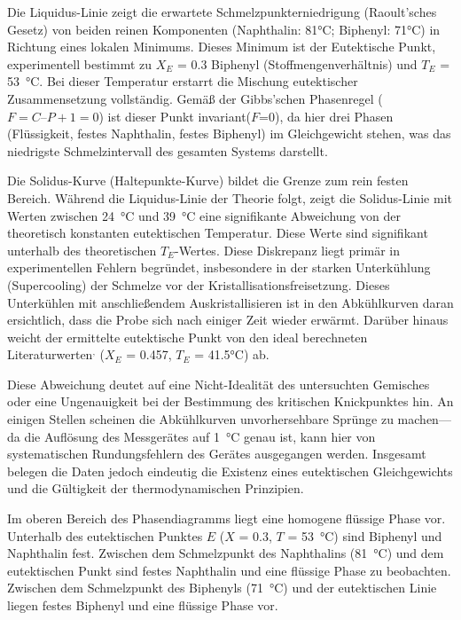 Die Liquidus-Linie zeigt die erwartete Schmelzpunkterniedrigung (Raoult'sches Gesetz) von beiden reinen Komponenten (Naphthalin: 81°C; Biphenyl: 71°C) in Richtung eines lokalen Minimums.
Dieses Minimum ist der Eutektische Punkt, experimentell bestimmt zu $X_E$ = 0.3 Biphenyl (Stoffmengenverhältnis) und $T_E$ = \qty{53}{\degreeCelsius}.
Bei dieser Temperatur erstarrt die Mischung eutektischer Zusammensetzung vollständig.
Gemäß der Gibbs'schen Phasenregel ($F = C – P + 1 = 0$) ist dieser Punkt invariant\autocite{caroline}($F$=0), da hier drei Phasen (Flüssigkeit, festes Naphthalin, festes Biphenyl) im Gleichgewicht stehen, was das niedrigste Schmelzintervall des gesamten Systems darstellt. 

Die Solidus-Kurve (Haltepunkte-Kurve) bildet die Grenze zum rein festen Bereich.
Während die Liquidus-Linie der Theorie folgt, zeigt die Solidus-Linie mit Werten zwischen \qty{24}{\degreeCelsius} und \qty{39}{\degreeCelsius} eine signifikante Abweichung von der theoretisch konstanten eutektischen Temperatur.
Diese Werte sind signifikant unterhalb des theoretischen $T_E$-Wertes. 
Diese Diskrepanz liegt primär in experimentellen Fehlern begründet, insbesondere in der starken Unterkühlung (Supercooling) der Schmelze vor der Kristallisationsfreisetzung.
Dieses Unterkühlen mit anschließendem Auskristallisieren ist in den Abkühlkurven daran ersichtlich, dass die Probe sich nach einiger Zeit wieder erwärmt.
Darüber hinaus weicht der ermittelte eutektische Punkt von den ideal berechneten Literaturwerten\autocite{phasendiagramme-organische-stoffe}$^,$\autocite{biphenyl-naphtalin} ($X_E$ = 0.457, $T_E$ = 41.5°C) ab.

Diese Abweichung deutet auf eine Nicht-Idealität des untersuchten Gemisches oder eine Ungenauigkeit bei der Bestimmung des kritischen Knickpunktes hin.
An einigen Stellen scheinen die Abkühlkurven unvorhersehbare Sprünge zu machen---da die Auflösung des Messgerätes auf \qty{1}{\degreeCelsius} genau ist, kann hier von systematischen Rundungsfehlern des Gerätes ausgegangen werden.
Insgesamt belegen die Daten jedoch eindeutig die Existenz eines eutektischen Gleichgewichts und die Gültigkeit der thermodynamischen Prinzipien. 

Im oberen Bereich des Phasendiagramms liegt eine homogene flüssige Phase vor. Unterhalb des eutektischen Punktes $E$ ($X$ = 0.3, $T$ = \qty{53}{\degreeCelsius}) sind Biphenyl und Naphthalin fest.
Zwischen dem Schmelzpunkt des Naphthalins (\qty{81}{\degreeCelsius}) und dem eutektischen Punkt sind festes Naphthalin und eine flüssige Phase zu beobachten.
Zwischen dem Schmelzpunkt des Biphenyls (\qty{71}{\degreeCelsius}) und der eutektischen Linie liegen festes Biphenyl und eine flüssige Phase vor.

\printbibliography


